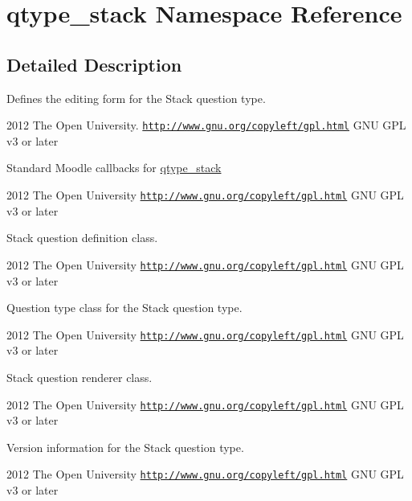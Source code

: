 \hypertarget{namespaceqtype__stack}{
\section{qtype\_\-stack Namespace Reference}
\label{namespaceqtype__stack}
}


\subsection{Detailed Description}
Defines the editing form for the Stack question type.

2012 The Open University.  \href{http://www.gnu.org/copyleft/gpl.html}{\tt http://www.gnu.org/copyleft/gpl.html} GNU GPL v3 or later

Standard Moodle callbacks for \hyperlink{classqtype__stack}{qtype\_\-stack}

2012 The Open University  \href{http://www.gnu.org/copyleft/gpl.html}{\tt http://www.gnu.org/copyleft/gpl.html} GNU GPL v3 or later

Stack question definition class.

2012 The Open University  \href{http://www.gnu.org/copyleft/gpl.html}{\tt http://www.gnu.org/copyleft/gpl.html} GNU GPL v3 or later

Question type class for the Stack question type.

2012 The Open University  \href{http://www.gnu.org/copyleft/gpl.html}{\tt http://www.gnu.org/copyleft/gpl.html} GNU GPL v3 or later

Stack question renderer class.

2012 The Open University  \href{http://www.gnu.org/copyleft/gpl.html}{\tt http://www.gnu.org/copyleft/gpl.html} GNU GPL v3 or later

Version information for the Stack question type.

2012 The Open University  \href{http://www.gnu.org/copyleft/gpl.html}{\tt http://www.gnu.org/copyleft/gpl.html} GNU GPL v3 or later 